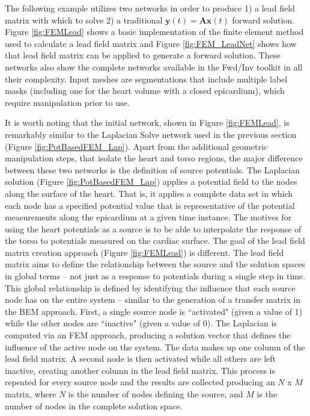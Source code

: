 The following example utilizes two networks in order to produce 1) a lead field matrix with which to solve
2) a traditional $\mathbf{y}(t) = \mathbf{A}\mathbf{x}(t)$ forward solution.
Figure \ref{fig:FEMLead} shows a basic implementation of the finite element method used to calculate a lead field matrix and Figure \ref{fig:FEM_LeadNet} shows how that lead field matrix can be applied to generate a forward solution.
These networks also show the complete networks available in the Fwd/Inv toolkit in all their complexity.
Input meshes are segmentations that include multiple label masks (including one for the heart volume with a closed epicardium), which require manipulation prior to use.

It is worth noting that the initial network, shown in Figure \ref{fig:FEMLead}, is remarkably similar to the Laplacian Solve network used in the previous section (Figure \ref{fig:PotBasedFEM_Lap}).
Apart from the additional geometric manipulation steps, that isolate the heart and torso regions, the major difference between these two networks is the definition of source potentials.
The Laplacian solution (Figure \ref{fig:PotBasedFEM_Lap}) applies a potential field to the nodes along the surface of the heart.
That is, it applies a complete data set in which each node has a specified potential value that is representative of the potential measurements along the epicardium at a given time instance.
The motives for using the heart potentials as a source is to be able to interpolate the response of the torso to potentials measured on the cardiac surface.
The goal of the lead field matrix creation approach (Figure \ref{fig:FEMLead}) is different.
The lead field matrix aims to define the relationship between the source and the solution spaces in global terms -- not just as a response to potentials during a single step in time.
This global relationship is defined by identifying the influence that each source node has on the entire system -- similar to the generation of a transfer matrix in the BEM approach.
First, a single source node is ``activated" (given a value of 1) while the other nodes are ``inactive" (given a value of 0).
The Laplacian is computed via an FEM approach, producing a solution vector that defines the influence of the active node on the system.
The data makes up one column of the lead field matrix.
A second node is then activated while all others are left inactive, creating another column in the lead field matrix.
This process is repeated for every source node and the results are collected producing an $N$ x $M$ matrix, where $N$ is the number of nodes defining the source, and $M$ is the number of nodes in the complete solution space.

